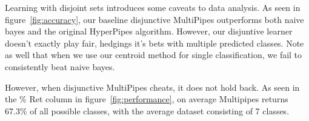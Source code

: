Learning with disjoint sets introduces some caveats to data analysis. As seen in figure~\ref{fig:accuracy}, our baseline disjunctive MultiPipes outperforms both naive bayes and the original HyperPipes algorithm. However, our disjuntive learner doesn't exactly play fair, hedgings it's bets with multiple predicted classes. Note as well that when we use our centroid method for single classification, we fail to consistently beat naive bayes.

However, when disjunctive MultiPipes cheats, it does not hold back. As seen in the \% Ret column in figure~\ref{fig:performance}, on average Multipipes returns 67.3\% of all possible classes, with the average dataset consisting of 7 classes.
